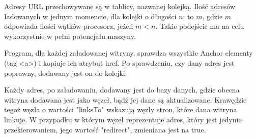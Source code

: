 \documentclass[a4paper, 12pt]{article}
\begin{document}
Adresy URL przechowywane są w tablicy, nazwanej kolejką. Ilość adresów ładowanych w jednym momencie, dla kolejki o długości \(n\); to \(m\), gdzie \(m\) odpowiada ilości wątków procesora, jeżeli \(m < n\). Takie podejście ma na celu wykorzystnie w pełni potencjału maszyny.

Program, dla każdej załadowanej witryny, sprawdza wszystkie Anchor elementy (tag <a>) i kopiuje ich atrybut href. Po sprawdzeniu, czy dany adres jest poprawny, dodawany jest on do kolejki.

Każdy adres, po załadowaniu, dodawany jest do bazy danych, gdzie obecna witryna dodawana jest jako węzeł, bądź jej dane są aktualizowane. Krawędzie tegoż węzła o wartości "linksTo" wskazują węzły stron, które dana witryna linkuje. W przypadku w którym węzeł reprezentuje adres, który jest jedynie przekierowaniem, jego wartość "redirect", zmieniana jest na true.




\printbibliography
\end{document}
